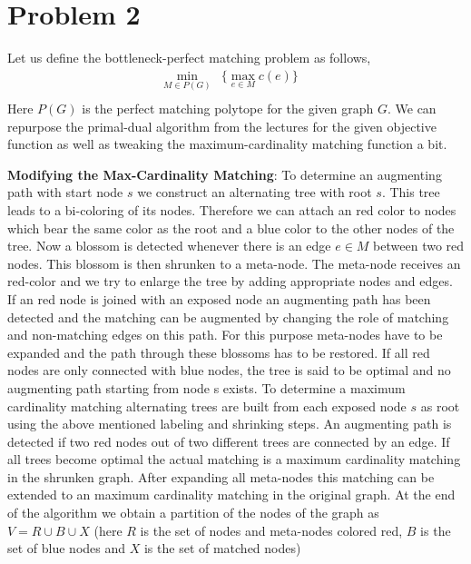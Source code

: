 \documentclass{article}
\numberwithin{equation}{section}
\begin{document}
\section{Problem 2}
Let us define the bottleneck-perfect matching problem as follows, 
\begin{equation*}
    \begin{array}{ccc}
        \min_{M\in{P(G)}}&\biggl\{ \max_{e\in M} c(e)\biggr\}&  \\
    \end{array}
\end{equation*}
Here $P(G)$ is the perfect matching polytope for the given graph $G$. We can repurpose the primal-dual algorithm from the lectures for the given objective function as well as tweaking the maximum-cardinality matching function a bit. 

\textbf{Modifying the Max-Cardinality Matching}: 
To determine an augmenting path with start node $s$ we construct an alternating tree with root $s$. This tree leads to a bi-coloring of its nodes. Therefore we can attach an red color to nodes which bear the same color as the root and a blue color to the other nodes of the tree. Now a blossom is detected whenever there is an edge $e \in M$ between two red nodes. This blossom is then shrunken to a meta-node. The meta-node receives an red-color and we try to enlarge the tree by adding appropriate nodes and edges. If an red node is joined with an exposed node an augmenting path has been detected and the matching can be augmented by changing the role of matching and non-matching edges on this path. For this purpose meta-nodes have to be expanded and the path through these blossoms has to be restored. If all red nodes are only connected with blue nodes, the tree is said to be optimal and no augmenting path starting from node s exists. To determine a maximum cardinality matching alternating trees are built from each exposed node $s$ as root using the above mentioned labeling and shrinking steps. An augmenting path is detected if two red nodes out of two different trees are connected by an edge. If all trees become optimal the actual matching is a maximum cardinality matching in the shrunken graph. After expanding all meta-nodes this matching can be extended to an maximum cardinality matching in the original graph. At the end of the algorithm we obtain a partition of the nodes of the graph as $V = R\cup B\cup X$ (here $R$ is the set of nodes and meta-nodes colored red, $B$ is the set of blue nodes and $X$ is the set of matched nodes) 
\end{document}
